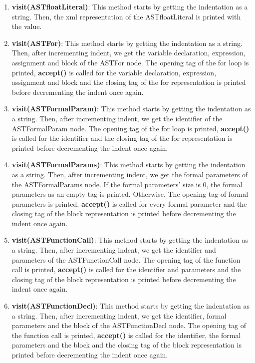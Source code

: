 \documentclass{article}
\begin{document}
\begin{enumerate}
					\item \textbf{visit(ASTfloatLiteral)}: This method starts by getting the indentation as a string. Then, the xml representation of the ASTfloatLiteral is printed with the value.
					
					\item \textbf{visit(ASTFor)}: This method starts by getting the indentation as a string. Then, after incrementing indent, we get the variable declaration, expression, assignment and block of the ASTFor node.  The opening tag of the for loop is printed, \textbf{accept()} is called for the variable declaration, expression, assignment and block and the closing tag of the for  representation is printed before decrementing the indent once again.		
			
					\item \textbf{visit(ASTFormalParam)}: This method starts by getting the indentation as a string. Then, after incrementing indent, we get the identifier of the ASTFormalParam node.  The opening tag of the for loop is printed, \textbf{accept()} is called for the identifier and the closing tag of the for  representation is printed before decrementing the indent once again.		
					
					\item \textbf{visit(ASTFormalParams)}: This method starts by getting the indentation as a string. Then, after incrementing indent, we get the formal parameters of the ASTFormalParams node.  If the formal parameters' size is 0, the formal parameters as an empty tag is printed. Otherwise,  The opening tag of formal parameters is printed, \textbf{accept()} is called for every formal parameter and the closing tag of the block representation is printed before decrementing the indent once again.	
			
					\item \textbf{visit(ASTFunctionCall)}: This method starts by getting the indentation as a string. Then, after incrementing indent, we get the identifier and parameters of the ASTFunctionCall node. The opening tag of the function call is printed, \textbf{accept()} is called for the identifier and parameters and the closing tag of the block representation is printed before decrementing the indent once again.	
				
					\item \textbf{visit(ASTFunctionDecl)}: This method starts by getting the indentation as a string. Then, after incrementing indent, we get the identifier, formal parameters and the block of the ASTFunctionDecl node. The opening tag of the function call is printed, \textbf{accept()} is called for the identifier, the formal parameters and the block and the closing tag of the block representation is printed before decrementing the indent once again.		
			

\end{enumerate}
\end{document}
